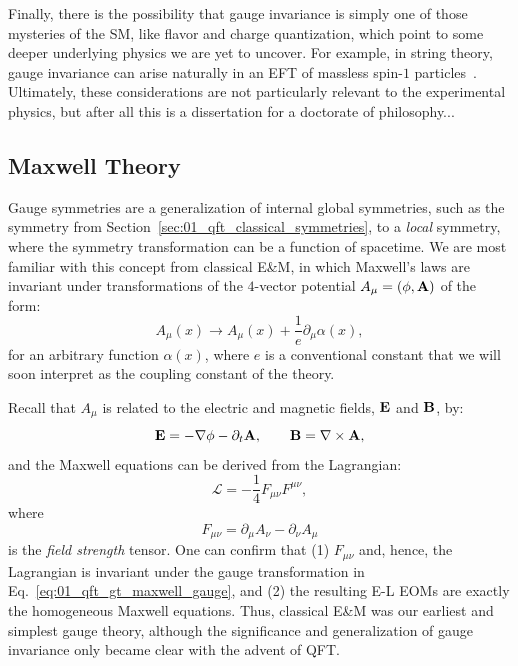 Finally, there is the possibility that gauge invariance is simply one of those mysteries of the SM, like flavor and charge quantization, which point to some deeper underlying physics we are yet to uncover.
For example, in string theory, gauge invariance can arise naturally in an EFT of massless spin-$1$ particles~\cite{Green:1987sp}.
Ultimately, these considerations are not particularly relevant to the experimental physics, but after all this is a dissertation for a doctorate of philosophy...


\subsection{Maxwell Theory}
\label{sec:01_qft_gt_maxwell}

Gauge symmetries are a generalization of internal global symmetries, such as the \UU[1] symmetry from Section~\ref{sec:01_qft_classical_symmetries}, to a \textit{local} symmetry, where the symmetry transformation can be a function of spacetime.
We are most familiar with this concept from classical E\&M, in which Maxwell's laws are invariant under transformations of the $4$-vector potential $A_\mu = (\phi, \mathbf{A})$ of the form:
\begin{equation}
	\label{eq:01_qft_gt_maxwell_gauge}
	A_\mu(x) \rightarrow A_\mu(x) + \frac{1}{e}\partial_\mu\alpha(x),
\end{equation}
for an arbitrary function $\alpha(x)$, where $e$ is a conventional constant that we will soon interpret as the coupling constant of the theory.

Recall that $A_\mu$ is related to the electric and magnetic fields, $\mathbf{E}$ and $\mathbf{B}$, by:
\begin{equation}
	\label{eq:01_qft_gt_maxwell_fields}
	\mathbf{E} = -\nabla\phi - \partial_t\mathbf{A}, \qquad \mathbf{B} = \nabla\times\mathbf{A},
\end{equation}
and the Maxwell equations can be derived from the Lagrangian:
\begin{equation}
	\label{eq:01_qft_gt_maxwell_lagrangian}
	\mathcal L = -\frac{1}{4}F_{\mu\nu}F^{\mu\nu},
\end{equation}
where
\begin{equation}
	\label{eq:01_qft_gt_maxwell_field_strength}
	F_{\mu\nu} = \partial_\mu A_\nu - \partial_\nu A_\mu
\end{equation}
is the \textit{field strength} tensor.
One can confirm that (1) $F_{\mu\nu}$ and, hence, the Lagrangian is invariant under the gauge transformation in Eq.~\ref{eq:01_qft_gt_maxwell_gauge}, and (2) the resulting E-L EOMs are exactly the homogeneous Maxwell equations.
Thus, classical E\&M was our earliest and simplest gauge theory, although the significance and generalization of gauge invariance only became clear with the advent of QFT.

